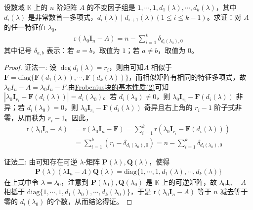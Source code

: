 \documentclass[../../main.tex]{subfiles}
\begin{document}
\begin{proposition}\label{proposition:特征值对应的特征矩阵的秩与不变因子组的关系}
设数域 $\mathbb{K}$ 上的 $n$ 阶矩阵 $A$ 的不变因子组是 $1,\cdots,1,d_1(\lambda),\cdots,d_k(\lambda)$，其中 $d_i(\lambda)$ 是非常数首一多项式，$d_i(\lambda)\mid d_{i + 1}(\lambda) (1\leq i\leq k - 1)$。求证：对 $A$ 的任一特征值 $\lambda_0$,
\begin{align*}
\mathrm{r}(\lambda_0\boldsymbol{I}_n - A)=n - \sum_{i = 1}^{k}\delta_{d_i(\lambda_0),0}
\end{align*}
其中记号 $\delta_{a,b}$ 表示：若 $a = b$，取值为 $1$；若 $a\neq b$，取值为 $0$。
\end{proposition}
\begin{proof}
{\color{blue}证法一:}
设 $\deg d_i(\lambda)=r_i$，则由可知$A$ 相似于 $\boldsymbol{F}=\mathrm{diag}\{\boldsymbol{F}(d_1(\lambda)),\cdots,\boldsymbol{F}(d_k(\lambda))\}$，而相似矩阵有相同的特征多项式，故$\lambda_0I_n-A=\lambda_0I_n-F$.由\hyperref[lemma:Frobenius标准型矩阵的极小多项式和不变因子]{Frobenius块的基本性质(2)}可知$|\lambda_0\boldsymbol{I}_{r_i}-\boldsymbol{F}(d_i(\lambda))|=d_i(\lambda_0)$。若 $d_i(\lambda_0)\neq 0$，则 $\lambda_0\boldsymbol{I}_{r_i}-\boldsymbol{F}(d_i(\lambda))$ 非异；若 $d_i(\lambda_0)=0$，则 $\lambda_0\boldsymbol{I}_{r_i}-\boldsymbol{F}(d_i(\lambda))$ 奇异且右上角的 $r_i - 1$ 阶子式非零，从而秩为 $r_i - 1$。因此，
\begin{align*}
\mathrm{r}(\lambda_0\boldsymbol{I}_n - A)&=\mathrm{r}(\lambda_0\boldsymbol{I}_n - \boldsymbol{F})=\sum_{i = 1}^{k}\mathrm{r}(\lambda_0\boldsymbol{I}_{r_i}-\boldsymbol{F}(d_i(\lambda)))\\
&=\sum_{i = 1}^{k}(r_i - \delta_{d_i(\lambda_0),0})=n - \sum_{i = 1}^{k}\delta_{d_i(\lambda_0),0}
\end{align*}

{\color{blue}证法二:}
由可知存在可逆 $\lambda$-矩阵 $\boldsymbol{P}(\lambda),\boldsymbol{Q}(\lambda)$，使得
\begin{align*}
\boldsymbol{P}(\lambda)(\lambda\boldsymbol{I}_n - A)\boldsymbol{Q}(\lambda)=\mathrm{diag}\{1,\cdots,1,d_1(\lambda),\cdots,d_k(\lambda)\}
\end{align*}
在上式中令 $\lambda = \lambda_0$，注意到 $\boldsymbol{P}(\lambda_0),\boldsymbol{Q}(\lambda_0)$ 是 $\mathbb{K}$ 上的可逆矩阵，故 $\lambda_0\boldsymbol{I}_n - A$ 相抵于 $\mathrm{diag}\{1,\cdots,1,d_1(\lambda_0),\cdots,d_k(\lambda_0)\}$，于是 $\mathrm{r}(\lambda_0\boldsymbol{I}_n - A)$ 等于 $n$ 减去等于零的 $d_i(\lambda_0)$ 的个数，从而结论得证。
\end{proof}
\end{document}
